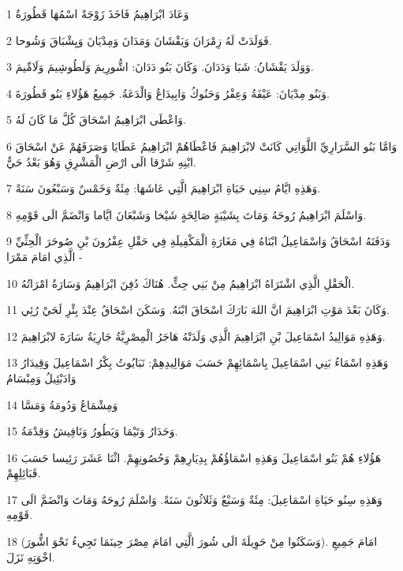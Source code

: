 \par 1 وَعَادَ ابْرَاهِيمُ فَاخَذَ زَوْجَةً اسْمُهَا قَطُورَةُ
\par 2 فَوَلَدَتْ لَهُ زِمْرَانَ وَيَقْشَانَ وَمَدَانَ وَمِدْيَانَ وَيِشْبَاقَ وَشُوحا.
\par 3 وَوَلَدَ يَقْشَانُ: شَبَا وَدَدَانَ. وَكَانَ بَنُو دَدَانَ: اشُّورِيمَ وَلَطُوشِيمَ وَلَامِّيمَ.
\par 4 وَبَنُو مِدْيَانَ: عَيْفَةُ وَعِفْرُ وَحَنُوكُ وَابِيدَاعُ وَالْدَعَةُ. جَمِيعُ هَؤُلاءِ بَنُو قَطُورَةَ.
\par 5 وَاعْطَى ابْرَاهِيمُ اسْحَاقَ كُلَّ مَا كَانَ لَهُ.
\par 6 وَامَّا بَنُو السَّرَارِيِّ اللَّوَاتِي كَانَتْ لابْرَاهِيمَ فَاعْطَاهُمْ ابْرَاهِيمُ عَطَايَا وَصَرَفَهُمْ عَنْ اسْحَاقَ ابْنِهِ شَرْقا الَى ارْضِ الْمَشْرِقِ وَهُوَ بَعْدُ حَيٌّ.
\par 7 وَهَذِهِ ايَّامُ سِنِي حَيَاةِ ابْرَاهِيمَ الَّتِي عَاشَهَا: مِئَةٌ وَخَمْسٌ وَسَبْعُونَ سَنَةً.
\par 8 وَاسْلَمَ ابْرَاهِيمُ رُوحَهُ وَمَاتَ بِشَيْبَةٍ صَالِحَةٍ شَيْخا وَشَبْعَانَ ايَّاما وَانْضَمَّ الَى قَوْمِهِ.
\par 9 وَدَفَنَهُ اسْحَاقُ وَاسْمَاعِيلُ ابْنَاهُ فِي مَغَارَةِ الْمَكْفِيلَةِ فِي حَقْلِ عِفْرُونَ بْنِ صُوحَرَ الْحِثِّيِّ الَّذِي امَامَ مَمْرَا -
\par 10 الْحَقْلِ الَّذِي اشْتَرَاهُ ابْرَاهِيمُ مِنْ بَنِي حِثٍّ. هُنَاكَ دُفِنَ ابْرَاهِيمُ وَسَارَةُ امْرَاتُهُ.
\par 11 وَكَانَ بَعْدَ مَوْتِ ابْرَاهِيمَ انَّ اللهَ بَارَكَ اسْحَاقَ ابْنَهُ. وَسَكَنَ اسْحَاقُ عِنْدَ بِئْرِ لَحَيْ رُئِي.
\par 12 وَهَذِهِ مَوَالِيدُ اسْمَاعِيلَ بْنِ ابْرَاهِيمَ الَّذِي وَلَدَتْهُ هَاجَرُ الْمِصْرِيَّةُ جَارِيَةُ سَارَةَ لابْرَاهِيمَ.
\par 13 وَهَذِهِ اسْمَاءُ بَنِي اسْمَاعِيلَ بِاسْمَائِهِمْ حَسَبَ مَوَالِيدِهِمْ: نَبَايُوتُ بِكْرُ اسْمَاعِيلَ وَقِيدَارُ وَادَبْئِيلُ وَمِبْسَامُ
\par 14 وَمِشْمَاعُ وَدُومَةُ وَمَسَّا
\par 15 وَحَدَارُ وَتَيْمَا وَيَطُورُ وَنَافِيشُ وَقِدْمَةُ.
\par 16 هَؤُلاءِ هُمْ بَنُو اسْمَاعِيلَ وَهَذِهِ اسْمَاؤُهُمْ بِدِيَارِهِمْ وَحُصُونِهِمْ. اثْنَا عَشَرَ رَئِيسا حَسَبَ قَبَائِلِهِمْ.
\par 17 وَهَذِهِ سِنُو حَيَاةِ اسْمَاعِيلَ: مِئَةٌ وَسَبْعٌ وَثَلاثُونَ سَنَةً. وَاسْلَمَ رُوحَهُ وَمَاتَ وَانْضَمَّ الَى قَوْمِهِ.
\par 18 (وَسَكَنُوا مِنْ حَوِيلَةَ الَى شُورَ الَّتِي امَامَ مِصْرَ حِينَمَا تَجِيءُ نَحْوَ اشُّورَ). امَامَ جَمِيعِ اخْوَتِهِ نَزَلَ.
